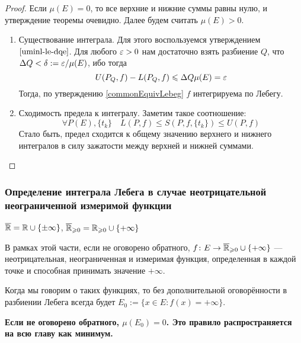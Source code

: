 \begin{proof}
	Если $\mu(E) = 0$, то все верхние и нижние суммы равны нулю, и утверждение теоремы очевидно. Далее будем считать $\mu(E) > 0$.
	\begin{enumerate}
		\item Существование интеграла. Для этого воспользуемся утверждением $\ref{uminl-le-dqe}$. Для любого $\varepsilon > 0$ нам достаточно взять разбиение $Q$, что $\Delta Q < \delta := \varepsilon / \mu(E)$, ибо тогда
		\[
			U(P_Q, f) - L(P_Q, f) \leqslant \Delta Q \mu(E) = \varepsilon
		\]
		Тогда, по утверждению \ref{commonEquivLebeg} $f$ интегрируема по Лебегу.
		
		\item Сходимость предела к интегралу. Заметим такое соотношение:
		\[
			\forall P(E), \{t_k\} \quad L(P, f) \le S(P, f, \{t_k\}) \le U(P, f)
		\]
		Стало быть, предел сходится к общему значению верхнего и нижнего интегралов в силу зажатости между верхней и нижней суммами.
	\end{enumerate}
\end{proof}

\subsubsection*{Определение интеграла Лебега в случае неотрицательной неограниченной измеримой функции}

\begin{designation}
	$\overline{\mathbb{R}} = \mathbb{R} \cup \{\pm\infty\}$, $\overline{\mathbb{R}}_{\geqslant 0} = \mathbb{R}_{\geqslant 0} \cup \{+\infty\}$
\end{designation}

\begin{note}
	В рамках этой части, если не оговорено обратного, $f \colon E \to \overline{\mathbb{R}}_{\geqslant 0} \cup \{+\infty\}$ --- неотрицательная, неограниченная и измеримая функция, определенная в каждой точке и способная принимать значение $+\infty$.
\end{note}

\begin{designation}
	Когда мы говорим о таких функциях, то без дополнительной оговорённости в разбиении Лебега всегда будет $E_0 := \{x \in E \colon f(x) = +\infty\}$.
\end{designation}

\begin{note}
	\textbf{Если не оговорено обратного, $\mu(E_0) = 0$. Это правило распространяется на всю главу как минимум.}
\end{note}

